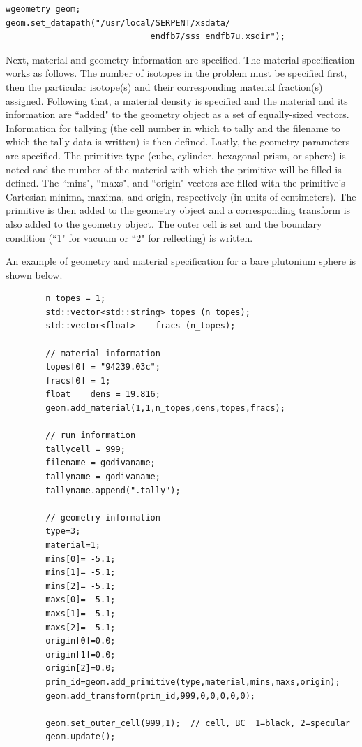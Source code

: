\documentclass[twoside,a4paper]{refart}
\begin{document}
\begin{verbatim}
wgeometry geom;
geom.set_datapath("/usr/local/SERPENT/xsdata/
                             endfb7/sss_endfb7u.xsdir");
\end{verbatim}

Next, material and geometry information are specified. The material specification works as follows. The 
number of isotopes in the problem must be specified first, then the particular isotope(s) and their 
corresponding material fraction(s) assigned. Following that, a material density is specified and the 
material and its information are ``added" to the geometry object as a set of equally-sized vectors. Information for tallying (the cell number in which to tally and the filename to which the tally data is written) is then defined.  Lastly, the geometry parameters are specified. The primitive type (cube, cylinder, hexagonal prism, or sphere) is noted and the number of the material with which the primitive will be filled is defined. The ``mins", ``maxs", and ``origin" vectors are filled with the primitive's Cartesian minima, maxima, and origin, respectively (in units of centimeters). The primitive is then added to the geometry object and a corresponding transform is also added to the geometry object. The outer cell is set and the boundary condition (``1" for vacuum or ``2" for reflecting) is written.

An example of geometry and material specification for a bare plutonium sphere is shown below.

\begin{verbatim}
		n_topes = 1;
		std::vector<std::string> topes (n_topes);
		std::vector<float>    fracs (n_topes);

		// material information
		topes[0] = "94239.03c";
		fracs[0] = 1;      
		float    dens = 19.816;
		geom.add_material(1,1,n_topes,dens,topes,fracs);
		
		// run information
		tallycell = 999;
		filename = godivaname;
		tallyname = godivaname;
		tallyname.append(".tally");
	
		// geometry information
		type=3;
		material=1;
		mins[0]= -5.1;
		mins[1]= -5.1;
		mins[2]= -5.1;
		maxs[0]=  5.1;
		maxs[1]=  5.1;
		maxs[2]=  5.1;
		origin[0]=0.0;
		origin[1]=0.0;
		origin[2]=0.0;
		prim_id=geom.add_primitive(type,material,mins,maxs,origin);
		geom.add_transform(prim_id,999,0,0,0,0,0);

		geom.set_outer_cell(999,1);  // cell, BC  1=black, 2=specular
		geom.update();
\end{verbatim}
\end{document}
